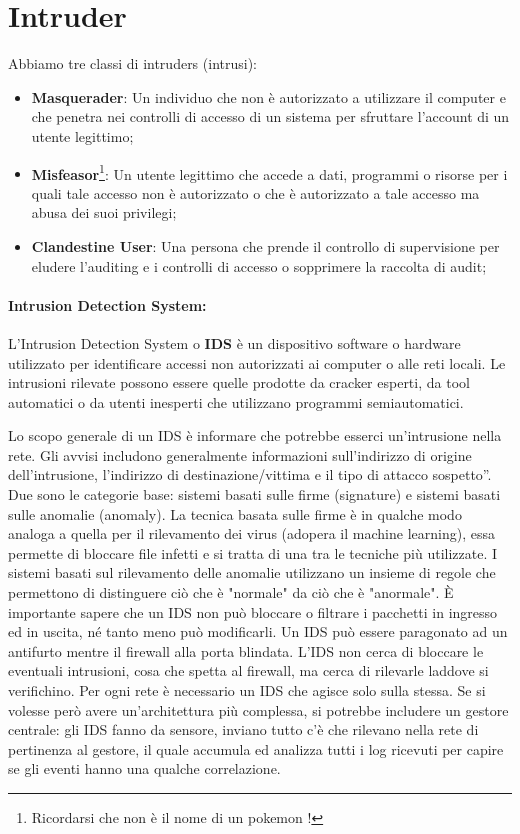 \section{Intruder}

Abbiamo tre classi di intruders (intrusi):

\begin{itemize}
      \item \textbf{Masquerader}: Un individuo che non è autorizzato a utilizzare il
            computer e che penetra nei
            controlli di accesso di un sistema per sfruttare l'account di un utente
            legittimo;
      \item \textbf{Misfeasor}\footnote{Ricordarsi che non è
                  il nome di un pokemon !}: Un utente legittimo che accede a dati,
            programmi o
            risorse per i
            quali tale
            accesso non è autorizzato o che è autorizzato a tale accesso ma
            abusa dei suoi
            privilegi;
      \item \textbf{Clandestine User}: Una persona che prende il controllo di supervisione
            per eludere l'auditing
            e i controlli di accesso o sopprimere la raccolta di audit;
\end{itemize}

\paragraph{Intrusion Detection System: }
L'Intrusion Detection System o \textbf{IDS} è un dispositivo software o hardware
utilizzato per
identificare accessi non autorizzati ai computer o alle reti locali.
Le intrusioni rilevate possono
essere quelle prodotte da cracker esperti, da tool automatici o da utenti
inesperti che utilizzano
programmi semiautomatici.

Lo scopo generale di un IDS è informare che potrebbe esserci un'intrusione nella rete. Gli avvisi
includono generalmente informazioni sull'indirizzo di origine dell'intrusione,
l'indirizzo di
destinazione/vittima e il tipo di attacco sospetto”.
Due sono le categorie base: sistemi basati sulle firme (signature) e sistemi
basati sulle anomalie (anomaly).
La tecnica basata sulle firme è in qualche modo analoga a quella per
il rilevamento dei
virus (adopera il machine learning), essa permette di bloccare file infetti e
si tratta di una tra le tecniche più utilizzate. I sistemi basati sul rilevamento delle anomalie utilizzano un
insieme di regole che
permettono di distinguere ciò che è "normale" da ciò che è "anormale".
È importante sapere che un IDS non può bloccare o filtrare i pacchetti in ingresso
ed in uscita, né
tanto meno può modificarli. Un IDS può essere paragonato ad un antifurto mentre
il firewall alla
porta blindata. L'IDS non cerca di bloccare le eventuali intrusioni, cosa che
spetta al firewall, ma
cerca di rilevarle laddove si verifichino.
Per ogni rete è necessario un IDS che agisce solo sulla stessa. Se si volesse
però avere
un'architettura più complessa, si potrebbe includere un gestore centrale:
gli IDS fanno da sensore,
inviano tutto c'è che rilevano nella rete di pertinenza al gestore,
il quale accumula ed analizza tutti i
log ricevuti per capire se gli eventi hanno una qualche correlazione.

